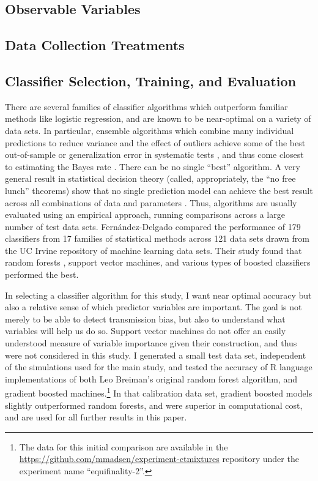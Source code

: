 \documentclass[10pt,letterpaper]{article}
\begin{document}
\subsection{Observable Variables}
\label{variable-selection}



\subsection{Data Collection Treatments}
\label{data-collection-treatments}


\subsection{Classifier Selection, Training, and Evaluation}
\label{classifier-selection-and-training}

There are several families of classifier algorithms which outperform familiar methods like logistic regression, and are known to be near-optimal on a variety of data sets.  In particular, ensemble algorithms which combine many individual predictions to reduce variance and the effect of outliers achieve some of the best out-of-sample or generalization error in systematic tests \cite{hastie2009elements}, and thus come closest to estimating the
Bayes rate \cite{tumer2003bayes}.  There can be no single ``best'' algorithm.  A very general result in statistical decision theory (called, appropriately, the ``no free lunch'' theorems) show that no single prediction model can achieve the best result across all combinations of data and parameters \cite{wolpert2002supervised, wolpert1997no}.  Thus, algorithms are usually evaluated using an empirical approach, running comparisons across a large number of test data sets.  Fern\'{a}ndez-Delgado \cite{Fernandez-Delgado:2014:WNH:2627435.2697065} compared the performance of 179 classifiers from 17 families of statistical methods across 121 data sets drawn from the UC Irvine repository of machine learning data sets.  Their study found that random forests \cite{breiman2001random}, support vector machines,
and various types of boosted classifiers \cite{hastie2009elements} performed the best.

In selecting a classifier algorithm for this study, I want near optimal accuracy but also a relative sense of which predictor variables are important.  The goal is not merely to be able to detect transmission bias, but also to understand what variables will help us do so.  Support vector machines do not offer an easily understood measure of variable importance given their construction, and thus were not considered in this study.  I generated a small test data set, independent of the simulations used for the main study, and tested the accuracy of R language implementations of both Leo Breiman's original random forest algorithm, and gradient boosted machines.\footnote{The data for this initial comparison are available in the \url{https://github.com/mmadsen/experiment-ctmixtures} repository under the experiment name ``equifinality-2''.}  In that calibration data set, gradient boosted models slightly outperformed random forests, and were superior in computational cost, and are used for all further results in this paper.  
\end{document}
